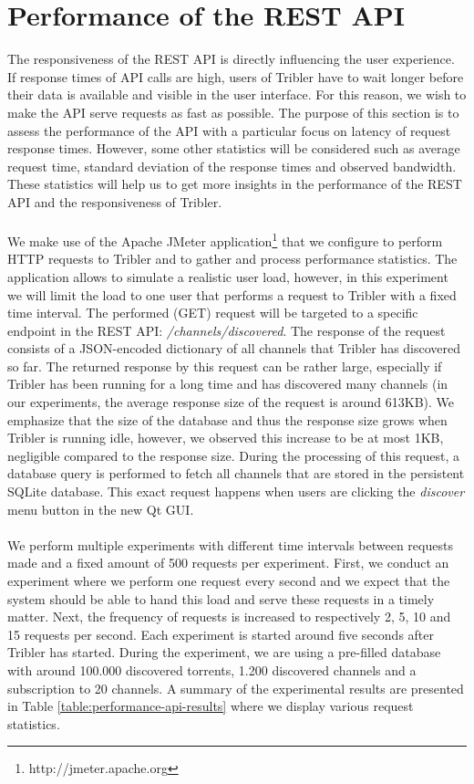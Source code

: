 \section{Performance of the REST API}
The responsiveness of the REST API is directly influencing the user experience. If response times of API calls are high, users of Tribler have to wait longer before their data is available and visible in the user interface. For this reason, we wish to make the API serve requests as fast as possible. The purpose of this section is to assess the performance of the API with a particular focus on latency of request response times. However, some other statistics will be considered such as average request time, standard deviation of the response times and observed bandwidth. These statistics will help us to get more insights in the performance of the REST API and the responsiveness of Tribler.\\\\
We make use of the Apache JMeter application\footnote{http://jmeter.apache.org} that we configure to perform HTTP requests to Tribler and to gather and process performance statistics. The application allows to simulate a realistic user load, however, in this experiment we will limit the load to one user that performs a request to Tribler with a fixed time interval. The performed (GET) request will be targeted to a specific endpoint in the REST API: \emph{/channels/discovered}. The response of the request consists of a JSON-encoded dictionary of all channels that Tribler has discovered so far. The returned response by this request can be rather large, especially if Tribler has been running for a long time and has discovered many channels (in our experiments, the average response size of the request is around 613KB). We emphasize that the size of the database and thus the response size grows when Tribler is running idle, however, we observed this increase to be at most 1KB, negligible compared to the response size. During the processing of this request, a database query is performed to fetch all channels that are stored in the persistent SQLite database. This exact request happens when users are clicking the \emph{discover} menu button in the new Qt GUI.\\\\
We perform multiple experiments with different time intervals between requests made and a fixed amount of 500 requests per experiment. First, we conduct an experiment where we perform one request every second and we expect that the system should be able to hand this load and serve these requests in a timely matter. Next, the frequency of requests is increased to respectively 2, 5, 10 and 15 requests per second. Each experiment is started around five seconds after Tribler has started. During the experiment, we are using a pre-filled database with around 100.000 discovered torrents, 1.200 discovered channels and a subscription to 20 channels. A summary of the experimental results are presented in Table \ref{table:performance-api-results} where we display various request statistics.\\

